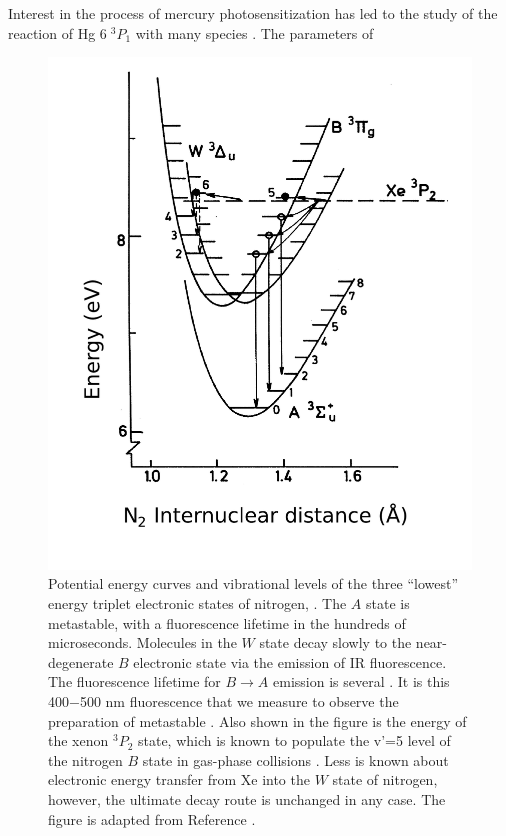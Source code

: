 \documentclass[12pt]{mitthesis}
\begin{document}
Interest in the process of mercury photosensitization has led to the
study of the reaction of Hg $6 \; ^3P_1$ with many species
\cite{duval91, ohmori96}.  The parameters of 

\begin{figure}
  \caption{Potential energy curves and vibrational levels of the three
    ``lowest'' energy triplet electronic states of nitrogen, .
    The $A$ state is metastable, with a fluorescence lifetime in the
    hundreds of microseconds.  Molecules in the $W$ state decay slowly
    to the near-degenerate $B$ electronic state via the emission of IR
    fluorescence.  The fluorescence lifetime for $B \rightarrow A$
    emission is several \microsec. It is this 400$-$500 nm
    fluorescence that we measure to observe the preparation of
    metastable .  Also shown in the figure is the energy of the
    xenon $^3P_2$ state, which is known to populate the v'=5 level of
    the nitrogen $B$ state in gas-phase collisions
    \cite{krumpelmann87}.  Less is known about electronic energy
    transfer from Xe into the $W$ state of nitrogen, however, the
    ultimate decay route is unchanged in any case.  The figure is
    adapted from Reference \cite{krumpelmann-thesis}.}
  \label{fig:n2curves}
  \centering
  \includegraphics[width=5in]{n2curves.pdf}
\end{figure}
\end{document}
